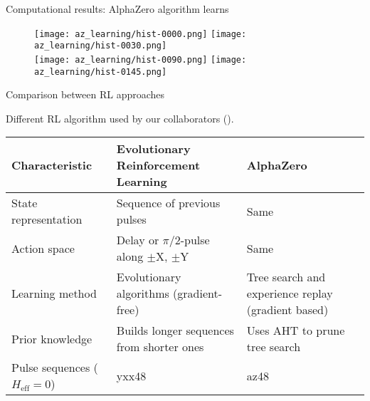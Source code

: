 \documentclass{beamer}
\begin{document}
\begin{frame}{Computational results: AlphaZero algorithm learns}

\begin{figure}
\centering
\texttt{[image: az\_learning/hist-0000.png]}
\texttt{[image: az\_learning/hist-0030.png]} \\
\texttt{[image: az\_learning/hist-0090.png]}
\texttt{[image: az\_learning/hist-0145.png]}
\end{figure}

\end{frame}

\begin{frame}{Comparison between RL approaches}

Different RL algorithm used by our collaborators (\cite{peng2021deep}).

\begin{table}
\centering
\begin{footnotesize}
\begin{tabular}{p{}|p{}|p{}}
    Characteristic & Evolutionary Reinforcement Learning & AlphaZero \\
    \hline
    State representation & Sequence of previous pulses & Same \\
    \hline
    Action space & Delay or $\pi/2$-pulse along $\pm$X, $\pm$Y & Same \\
    \hline
    Learning method & Evolutionary algorithms (gradient-free) & Tree search and experience replay (gradient based) \\
    \hline
    Prior knowledge & Builds longer sequences from shorter ones & Uses AHT to prune tree search \\
    \hline
    Pulse sequences ($H_\text{eff} = 0$) & yxx48 & az48
\end{tabular}
\end{footnotesize}
\end{table}

\end{frame}
\end{document}
